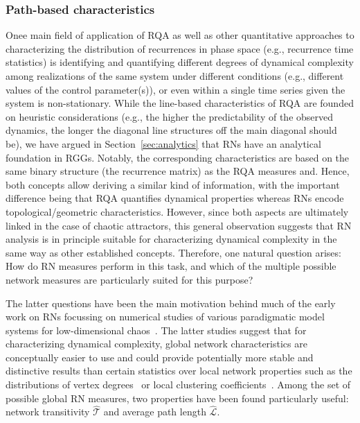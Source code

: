 		\subsubsection{Path-based characteristics}

Onee main field of application of RQA as well as other quantitative approaches to characterizing the distribution of recurrences in phase space (e.g., recurrence time statistics) is identifying and quantifying different degrees of dynamical complexity among realizations of the same system under different conditions (e.g., different values of the control parameter(s)), or even within a single time series given the system is non-stationary. While the line-based characteristics of RQA are founded on heuristic considerations (e.g., the higher the predictability of the observed dynamics, the longer the diagonal line structures off the main diagonal should be), we have argued in Section~\ref{sec:analytics} that RNs have an analytical foundation in RGGs. Notably, the corresponding characteristics are based on the same binary structure (the recurrence matrix) as the RQA measures and. Hence, both concepts allow deriving a similar kind of information, with the important difference being that RQA quantifies dynamical properties whereas RNs encode topological/geometric characteristics. However, since both aspects are ultimately linked in the case of chaotic attractors, this general observation suggests that RN analysis is in principle suitable for characterizing dynamical complexity in the same way as other established concepts. Therefore, one natural question arises: How do RN measures perform in this task, and which of the multiple possible network measures are particularly suited for this purpose?

The latter questions have been the main motivation behind much of the early work on RNs focussing on numerical studies of various paradigmatic model systems for low-dimensional chaos~\cite{Donner2010Nolta,Donner2011IJBC,Donner2010PRE,Donner2010NJP,Marwan2009,Zou2010,Zou2012aChaos}. The latter studies suggest that for characterizing dynamical complexity, global network characteristics are conceptually easier to use and could provide potentially more stable and distinctive results than certain statistics over local network properties such as the distributions of vertex degrees~\cite{Zou2012EPL} or local clustering coefficients~\cite{Zou2012aChaos}. Among the set of possible global RN measures, two properties have been found particularly useful: network transitivity $\hat{\mathcal{T}}$ and average path length $\hat{\mathcal{L}}$.


